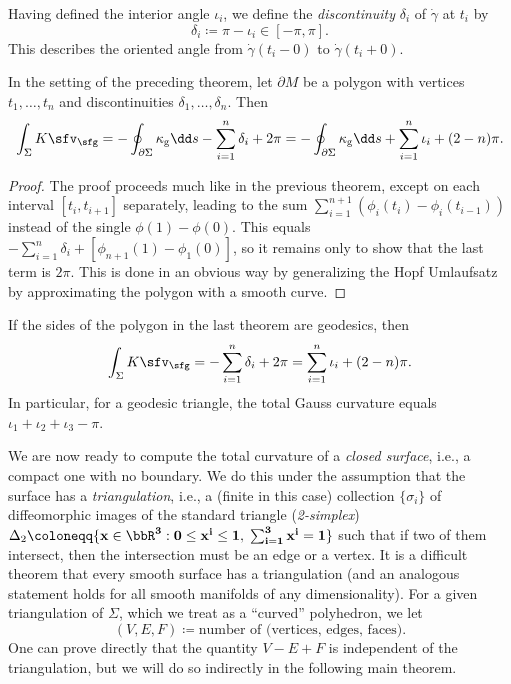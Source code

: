 Having defined the interior angle $\iota_i$, we define the \emph{discontinuity} $\delta_i$ of $\dot\gamma$ at $t_i$ by 
\[\delta_i\coloneqq \pi-\iota_i\in [-\pi,\pi].\]
This describes the oriented angle from $\dot\gamma(t_i-0)$ to $\dot\gamma(t_i+0)$.

\begin{thm}
    In the setting of the preceding theorem, let $\partial M$ be a polygon with vertices $t_1,\ldots,t_n$ and discontinuities $\delta_1,\ldots,\delta_n$. Then 
    \[\int_\Sigma K\sfv_\sfg=-\oint_{\partial \Sigma}\kappa_{\mathrm{g}}\dd s-\sum_{i=1}^n\delta_i+2\pi=-\oint_{\partial \Sigma}\kappa_{\mathrm{g}}\dd s+\sum_{i=1}^n\iota_i+(2-n)\pi.\]
\end{thm}
\begin{proof}
    The proof proceeds much like in the previous theorem, except on each interval $[t_i,t_{i+1}]$ separately, leading to the sum $\sum_{i=1}^{n+1}(\phi_i(t_i)-\phi_i(t_{i-1}))$ instead of the single $\phi(1)-\phi(0)$. This equals $-\sum_{i=1}^n\delta_i+[\phi_{n+1}(1)-\phi_1(0)]$, so it remains only to show that the last term is $2\pi$. This is done in an obvious way by generalizing the Hopf Umlaufsatz by approximating the polygon with a smooth curve.
\end{proof}


\begin{cor}\label{cor 6.7 Spivak3}
    If the sides of the polygon in the last theorem are geodesics, then 
    \[\int_\Sigma K\sfv_\sfg=-\sum_{i=1}^n\delta_i+2\pi=\sum_{i=1}^n\iota_i+(2-n)\pi.\]
    In particular, for a geodesic triangle, the total Gauss curvature equals $\iota_1+\iota_2+\iota_3-\pi$.
\end{cor}

We are now ready to compute the total curvature of a \emph{closed surface}, i.e., a compact one with no boundary. We do this under the assumption that the surface has a \emph{triangulation}, i.e., a (finite in this case) collection  $\{\sigma_i\}$ of diffeomorphic images of the standard triangle (\emph{2-simplex}) $\Delta_2\coloneqq \{\bf{x}\in\bbR^3:0\leq x^i\leq 1,\; \sum_{i=1}^3 x^i=1\}$ such that if two of them intersect, then the intersection must be an edge or a vertex. It is a difficult theorem that every smooth surface has a triangulation (and an analogous statement holds for all smooth manifolds of any dimensionality). For a given triangulation of $\Sigma$, which we treat as a ``curved'' polyhedron, we let 
\[(V,E,F)\coloneqq \text{number of (vertices, edges, faces)}.\]
One can prove directly that the quantity $V-E+F$ is independent of the triangulation, but we will do so indirectly in the following main theorem.

